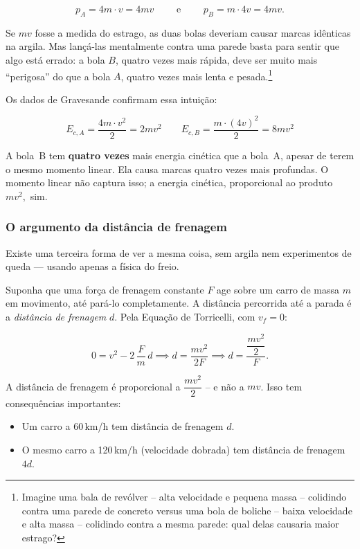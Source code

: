 \[
    p_A = 4m \cdot v = 4mv \qquad \text{ e } \qquad p_B = m \cdot 4v = 4mv.
\]
 
\noindent Se $mv$ fosse a medida do estrago, as duas bolas deveriam causar marcas
idênticas na argila. Mas lançá-las mentalmente contra uma parede basta para sentir que
algo está errado: a bola $B$, quatro vezes mais rápida, deve ser muito mais ``perigosa''
do que a bola $A$, quatro vezes mais lenta e pesada.\footnote{Imagine uma bala de revólver -- alta velocidade e pequena massa -- colidindo contra uma parede de concreto versus uma bola de boliche -- baixa velocidade e alta massa -- colidindo contra a mesma parede: qual delas causaria maior estrago?}
 
Os dados de Gravesande confirmam essa intuição:
 
\[
    E_{c,A} = \frac{4m \cdot v^2}{2} = 2mv^2
    \qquad
    E_{c,B} = \frac{m \cdot (4v)^2}{2} = 8mv^2
\]
 
\noindent A bola~B tem \textbf{quatro vezes} mais energia cinética que a bola~A,
apesar de terem o mesmo momento linear. Ela causa marcas quatro vezes mais profundas.
O momento linear não captura isso; a energia cinética, proporcional ao produto $mv^2,$ sim.
 
\subsubsection*{O argumento da distância de frenagem}
 
Existe uma terceira forma de ver a mesma coisa, sem argila nem experimentos de queda —
usando apenas a física do freio.
 
Suponha que uma força de frenagem constante $F$ age sobre um carro de massa $m$ em
movimento, até pará-lo completamente. A distância percorrida até a parada é a
\textit{distância de frenagem} $d$. Pela Equação de Torricelli,
com $v_f = 0$:
 
\[
    0 = v^2 - 2\,\frac{F}{m}\,d
    \implies
    d = \frac{mv^2}{2F} \implies d = \dfrac{\dfrac{mv^2}{2}}{F}.
\]
 
\noindent A distância de frenagem é proporcional a $\dfrac{mv^2}{2}$ -- e não a $mv$.
Isso tem consequências importantes:
 
\begin{itemize}
    \item [(i)] Um carro a 60\,km/h tem distância de frenagem $d$.
    \item [(ii)] O mesmo carro a 120\,km/h (velocidade dobrada) tem distância de frenagem $4d$.
\end{itemize}
 
